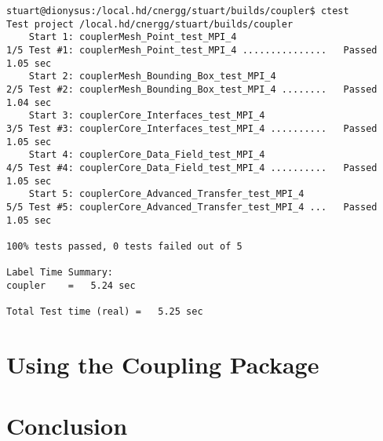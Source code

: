 \documentclass[letterpaper]{article}
\begin{document}
\begin{verbatim}
stuart@dionysus:/local.hd/cnergg/stuart/builds/coupler$ ctest
Test project /local.hd/cnergg/stuart/builds/coupler
    Start 1: couplerMesh_Point_test_MPI_4
1/5 Test #1: couplerMesh_Point_test_MPI_4 ...............   Passed    1.05 sec
    Start 2: couplerMesh_Bounding_Box_test_MPI_4
2/5 Test #2: couplerMesh_Bounding_Box_test_MPI_4 ........   Passed    1.04 sec
    Start 3: couplerCore_Interfaces_test_MPI_4
3/5 Test #3: couplerCore_Interfaces_test_MPI_4 ..........   Passed    1.05 sec
    Start 4: couplerCore_Data_Field_test_MPI_4
4/5 Test #4: couplerCore_Data_Field_test_MPI_4 ..........   Passed    1.05 sec
    Start 5: couplerCore_Advanced_Transfer_test_MPI_4
5/5 Test #5: couplerCore_Advanced_Transfer_test_MPI_4 ...   Passed    1.05 sec

100% tests passed, 0 tests failed out of 5

Label Time Summary:
coupler    =   5.24 sec

Total Test time (real) =   5.25 sec
\end{verbatim}

\section{Using the Coupling Package}

\section{Conclusion}

\pagebreak


\end{document}
